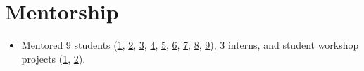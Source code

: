 \documentclass[11pt,a4paper]{article}
\begin{document}
\section{Mentorship}
\begin{itemize}
  \item Mentored 9 students (\href{https://www.hse.ru/edu/vkr/219430466}{1}, \href{https://www.hse.ru/edu/vkr/296294066}{2}, \href{https://www.hse.ru/edu/vkr/219524130}{3}, \href{https://www.hse.ru/en/edu/vkr/470561417}{4}, \href{https://www.hse.ru/en/edu/vkr/470935224}{5}, \href{https://www.hse.ru/ma/datasci/students/diplomas/631565328}{6}, \href{https://www.hse.ru/ma/datasci/students/diplomas/631565422}{7}, \href{https://www.hse.ru/edu/vkr/624890096}{8}, \href{https://www.hse.ru/ba/ami/students/diplomas/834351454}{9}), 3 interns, and student workshop projects (\href{https://sochisirius.ru/news/3148}{1}, \href{https://web.archive.org/web/20220512040654/https://academy.yandex.ru/posts/vossozdat-arkhitekturu-bazy-dannykh-i-nauchit-golosovogo-pomoschnika-predskazyvat-namereniya-polzovatelya}{2}).
\end{itemize}
\end{document}
